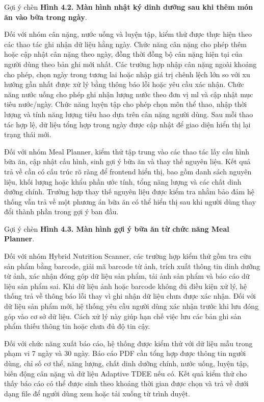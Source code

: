 \documentclass[12pt, a4paper]{report}
\begin{document}
Gợi ý chèn \textbf{Hình 4.2. Màn hình nhật ký dinh dưỡng sau khi thêm món ăn vào bữa trong ngày}.

Đối với nhóm cân nặng, nước uống và luyện tập, kiểm thử được thực hiện theo các thao tác ghi nhận dữ liệu hằng ngày. Chức năng cân nặng cho phép thêm hoặc cập nhật cân nặng theo ngày, đồng thời đồng bộ cân nặng hiện tại của người dùng theo bản ghi mới nhất. Các trường hợp nhập cân nặng ngoài khoảng cho phép, chọn ngày trong tương lai hoặc nhập giá trị chênh lệch lớn so với xu hướng gần nhất được xử lý bằng thông báo lỗi hoặc yêu cầu xác nhận. Chức năng nước uống cho phép ghi nhận lượng nước theo đơn vị ml và cập nhật mục tiêu nước/ngày. Chức năng luyện tập cho phép chọn môn thể thao, nhập thời lượng và tính năng lượng tiêu hao dựa trên cân nặng người dùng. Sau mỗi thao tác hợp lệ, dữ liệu tổng hợp trong ngày được cập nhật để giao diện hiển thị lại trạng thái mới.

Đối với nhóm Meal Planner, kiểm thử tập trung vào các thao tác lấy cấu hình bữa ăn, cập nhật cấu hình, sinh gợi ý bữa ăn và thay thế nguyên liệu. Kết quả trả về cần có cấu trúc rõ ràng để frontend hiển thị, bao gồm danh sách nguyên liệu, khối lượng hoặc khẩu phần ước tính, tổng năng lượng và các chất dinh dưỡng chính. Trường hợp thay thế nguyên liệu được kiểm tra nhằm bảo đảm hệ thống vẫn trả về một phương án bữa ăn có thể hiển thị sau khi người dùng thay đổi thành phần trong gợi ý ban đầu.

Gợi ý chèn \textbf{Hình 4.3. Màn hình gợi ý bữa ăn từ chức năng Meal Planner}.

Đối với nhóm Hybrid Nutrition Scanner, các trường hợp kiểm thử gồm tra cứu sản phẩm bằng barcode, giải mã barcode từ ảnh, trích xuất thông tin dinh dưỡng từ ảnh, xác nhận đóng góp dữ liệu sản phẩm, tải ảnh sản phẩm và báo cáo dữ liệu sản phẩm sai. Khi dữ liệu ảnh hoặc barcode không đủ điều kiện xử lý, hệ thống trả về thông báo lỗi thay vì ghi nhận dữ liệu chưa được xác nhận. Đối với dữ liệu sản phẩm mới, hệ thống yêu cầu người dùng xác nhận trước khi lưu đóng góp vào cơ sở dữ liệu. Cách xử lý này giúp hạn chế việc lưu các bản ghi sản phẩm thiếu thông tin hoặc chưa đủ độ tin cậy.

Đối với chức năng xuất báo cáo, hệ thống được kiểm thử với dữ liệu mẫu trong phạm vi 7 ngày và 30 ngày. Báo cáo PDF cần tổng hợp được thông tin người dùng, chỉ số cơ thể, năng lượng, chất dinh dưỡng chính, nước uống, luyện tập, biến động cân nặng và dữ liệu Adaptive TDEE nếu có. Kết quả kiểm thử cho thấy báo cáo có thể được sinh theo khoảng thời gian được chọn và trả về dưới dạng file để người dùng xem hoặc tải xuống từ trình duyệt.
\end{document}
